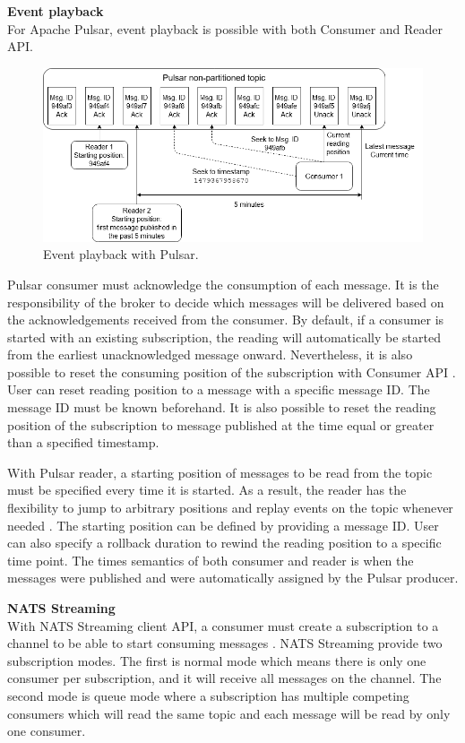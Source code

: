 \textbf{Event playback}\\
For Apache Pulsar, event playback is possible with both Consumer and Reader API.
\begin{figure}[h]
	\centering
	\includegraphics[width=\linewidth]{images/event-playback-pulsar.png}
	\caption{Event playback with Pulsar.}
	\label{fig:pulsareventplayback}
\end{figure}

Pulsar consumer must acknowledge the consumption of each message. It is the responsibility of the broker to decide which messages will be delivered based on the acknowledgements received from the consumer. By default, if a consumer is started with an existing subscription, the reading will automatically be started from the earliest unacknowledged message onward. Nevertheless, it is also possible to reset the consuming position of the subscription with Consumer API \cite{pulsarconsumerapi}. User can reset reading position to a message with a specific message ID. The message ID must be known beforehand. It is also possible to reset the reading position of the subscription to message published at the time equal or greater than a specified timestamp. 

With Pulsar reader, a starting position of messages to be read from the topic must be specified every time it is started. As a result, the reader has the flexibility to jump to arbitrary positions and replay events on the topic whenever needed \cite{pulsarreaderapi}. The starting position can be defined by providing a message ID. User can also specify a rollback duration to rewind the reading position to a specific time point. The times semantics of both consumer and reader is when the messages were published and were automatically assigned by the Pulsar producer.

\large \textbf{NATS Streaming}\\
\normalsize
With NATS Streaming client API, a consumer must create a subscription to a channel to be able to start consuming messages \cite{natsconceptchannels}. NATS Streaming provide two subscription modes. The first is normal mode which means there is only one consumer per subscription, and it will receive all messages on the channel. The second mode is queue mode where a subscription has multiple competing consumers which will read the same topic and each message will be read by only one consumer. 


